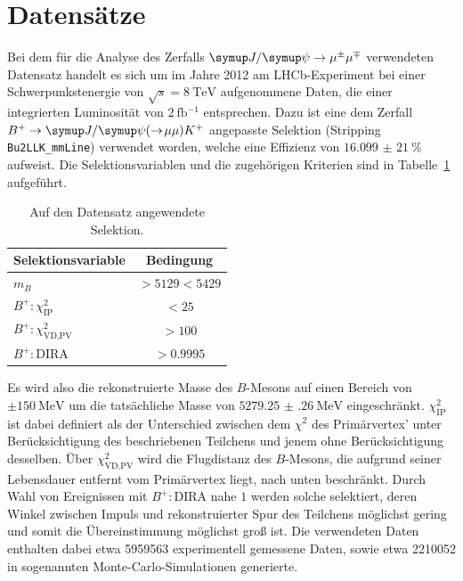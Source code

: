 \section{Datensätze}
%
Bei dem für die Analyse des Zerfalls $\kontroll$ verwendeten Datensatz handelt es sich um im Jahre 2012 am LHCb-Experiment bei einer Schwerpunkstenergie von $\sqrt{s}=\SI{8}{\tera\electronvolt}$ aufgenommene Daten, die einer integrierten Luminosität von $\SI{2}{\femto\barn^{-1}}$ entsprechen. Dazu ist eine dem Zerfall $B^{+}\rightarrow\jpsi(\rightarrow\!\mu\mu) K^{+}$ angepasste Selektion (Stripping \texttt{Bu2LLK\_mmLine}) verwendet worden, welche eine Effizienz von $\SI{16,099(21)}{\percent}$ aufweist. Die Selektionsvariablen und die zugehörigen Kriterien sind in Tabelle~\ref{tab:bstrip} aufgeführt.
%
\begin{table}[htb]
  \centering
  \caption{Auf den Datensatz angewendete Selektion.}
  \begin{tabular}{lc}
    \toprule
    Selektionsvariable                & Bedingung      \\
    \midrule
    $m_{B}$                           & $>\num{5129}<\num{5429}$  \\
    $B^{+}:\chi_{\text{IP}}^2$        & $<\num{25}$  \\
    $B^{+}:\chi_{\text{VD,PV}}^2$     & $>\num{100}$  \\
    $B^{+}:\text{DIRA}$               & $>\num{0.9995}$  \\
    \bottomrule
  \end{tabular}
  \label{tab:bstrip}
\end{table}
%
Es wird also die rekonstruierte Masse des $B$-Mesons auf einen Bereich von $\pm\SI{150}{\mega\electronvolt}$ um die tatsächliche Masse von $\SI{5279.25(26)}{\mega\electronvolt}$ eingeschränkt. $\chi_{\text{IP}}^2$ ist dabei definiert als der Unterschied zwischen dem $\chi^2$ des Primärvertex' unter Berücksichtigung des beschriebenen Teilchens und jenem ohne Berücksichtigung desselben. Über $\chi_{\text{VD,PV}}^2$ wird die Flugdistanz des $B$-Mesons, die aufgrund seiner Lebensdauer entfernt vom Primärvertex liegt, nach unten beschränkt. Durch Wahl von Ereignissen mit $B^{+}:\text{DIRA}$ nahe $1$ werden solche selektiert, deren Winkel zwischen Impuls und rekonstruierter Spur des Teilchens möglichst gering und somit die Übereinstimmung möglichst groß ist.
Die verwendeten Daten enthalten dabei etwa 5959563 experimentell gemessene Daten, sowie etwa 2210052 in sogenannten Monte-Carlo-Simulationen generierte.\\

